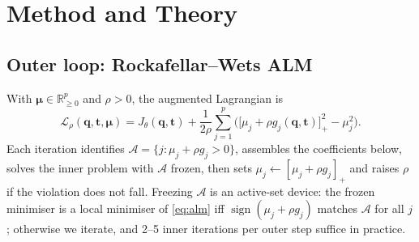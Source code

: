 \section{Method and Theory}\label{sec:method}

\subsection{Outer loop: Rockafellar--Wets ALM}\label{sec:alm}
With $\boldsymbol\mu\in\mathbb{R}^p_{\ge0}$ and $\rho>0$, the augmented Lagrangian is
\begin{equation}
\mathcal L_\rho(\mathbf q,\mathbf t,\boldsymbol\mu)=J_\theta(\mathbf q,\mathbf t)+\frac{1}{2\rho}\sum_{j=1}^p\Big(\big[\mu_j+\rho g_j(\mathbf q,\mathbf t)\big]_+^2-\mu_j^2\Big).
\label{eq:alm}
\end{equation}
Each iteration identifies $\mathcal A=\{j:\mu_j+\rho g_j>0\}$, assembles the coefficients below, solves the inner problem with $\mathcal A$ frozen, then sets $\mu_j\leftarrow[\mu_j+\rho g_j]_+$ and raises $\rho$ if the violation does not fall. Freezing $\mathcal A$ is an active-set device: the frozen minimiser is a local minimiser of \eqref{eq:alm} iff $\operatorname{sign}(\mu_j+\rho g_j)$ matches $\mathcal A$ for all $j$; otherwise we iterate, and 2--5 inner iterations per outer step suffice in practice.

